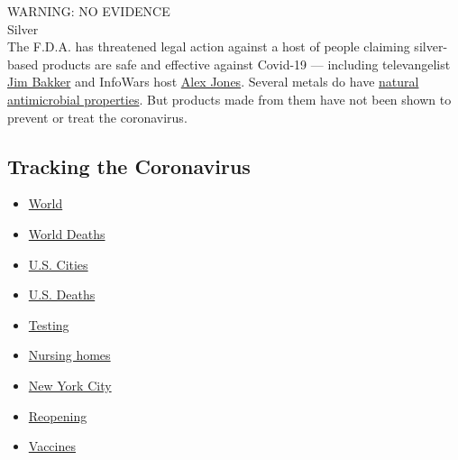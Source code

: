 WARNING: NO EVIDENCE\\
Silver\\
The F.D.A. has threatened legal action against a host of people claiming
silver-based products are safe and effective against Covid-19 ---
including televangelist
\href{https://www.fda.gov/inspections-compliance-enforcement-and-criminal-investigations/warning-letters/jim-bakker-show-604820-03062020}{Jim
Bakker} and InfoWars host
\href{https://www.fda.gov/inspections-compliance-enforcement-and-criminal-investigations/warning-letters/free-speech-systems-llc-dba-infowarscom-605802-04092020}{Alex
Jones}. Several metals do have
\href{https://www.nytimes3xbfgragh.onion/article/copper-coronavirus-masks.html}{natural
antimicrobial properties}. But products made from them have not been
shown to prevent or treat the coronavirus.

\hypertarget{tracking-the-coronavirus}{%
\subsection{Tracking the Coronavirus}\label{tracking-the-coronavirus}}

\begin{itemize}
\tightlist
\item
  \href{https://www.nytimes3xbfgragh.onion/interactive/2020/world/coronavirus-maps.html}{World}
\item
  \href{https://www.nytimes3xbfgragh.onion/interactive/2020/04/21/world/coronavirus-missing-deaths.html}{World
  Deaths}
\item
  \href{https://www.nytimes3xbfgragh.onion/interactive/2020/04/23/upshot/five-ways-to-monitor-coronavirus-outbreak-us.html}{U.S.
  Cities}
\item
  \href{https://www.nytimes3xbfgragh.onion/interactive/2020/05/05/us/coronavirus-death-toll-us.html}{U.S.
  Deaths}
\item
  \href{https://www.nytimes3xbfgragh.onion/interactive/2020/us/coronavirus-testing.html}{Testing}
\item
  \href{https://www.nytimes3xbfgragh.onion/interactive/2020/us/coronavirus-nursing-homes.html}{Nursing
  homes}
\item
  \href{https://www.nytimes3xbfgragh.onion/interactive/2020/nyregion/new-york-city-coronavirus-cases.html}{New
  York City}
\item
  \href{https://www.nytimes3xbfgragh.onion/interactive/2020/us/states-reopen-map-coronavirus.html}{Reopening}
\item
  \href{https://www.nytimes3xbfgragh.onion/interactive/2020/science/coronavirus-vaccine-tracker.html}{Vaccines}
\end{itemize}


